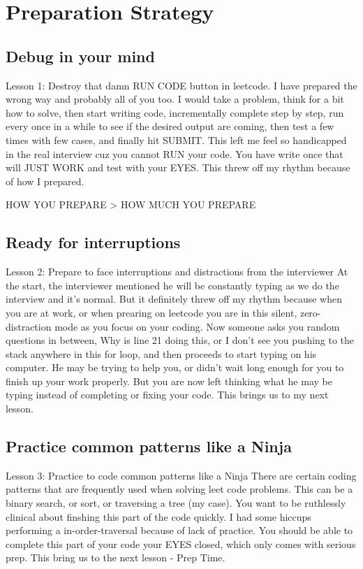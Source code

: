 \chapter{Preparation Strategy}

\section{Debug in your mind}
Lesson 1: Destroy that damn RUN CODE button in leetcode. I have prepared the wrong way and probably
all of you too. I would take a problem, think for a bit how to solve, then start writing code,
incrementally complete step by step, run every once in a while to see if the desired output are
coming, then test a few times with few cases, and finally hit SUBMIT. This left me feel so
handicapped in the real interview cuz you cannot RUN your code. You have write once that will JUST
WORK and test with your EYES. This threw off my rhythm because of how I prepared.

HOW YOU PREPARE > HOW MUCH YOU PREPARE
\section{Ready for interruptions}
Lesson 2: Prepare to face interruptions and distractions from the interviewer At the start, the
interviewer mentioned he will be constantly typing as we do the interview and it's normal. But it
definitely threw off my rhythm because when you are at work, or when prearing on leetcode you are in
this silent, zero-distraction mode as you focus on your coding. Now someone asks you random
questions in between, Why is line 21 doing this, or I don't see you pushing to the stack anywhere in
this for loop, and then proceeds to start typing on his computer. He may be trying to help you, or
didn't wait long enough for you to finish up your work properly. But you are now left thinking what
he may be typing instead of completing or fixing your code. This brings us to my next lesson.

\section{Practice common patterns like a Ninja}
Lesson 3: Practice to code common patterns like a Ninja There are certain coding patterns that are
frequently used when solving leet code problems. This can be a binary search, or sort, or traversing
a tree (my case). You want to be ruthlessly clinical about finshing this part of the code quickly. I
had some hiccups performing a in-order-traversal because of lack of practice. You should be able to
complete this part of your code your EYES closed, which only comes with serious prep. This bring us
to the next lesson - Prep Time.

